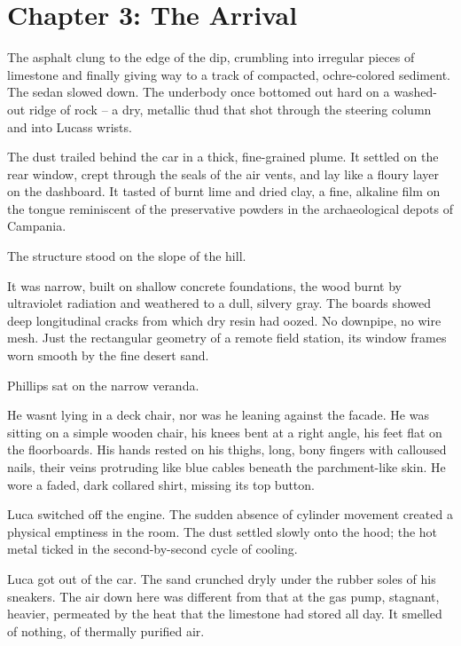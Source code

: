 \documentclass[
  ngerman,
]{article}
\begin{document}
\section{}\label{section}

\section{\texorpdfstring{\textbf{Chapter 3: The
Arrival}}{Chapter 3: The Arrival}}\label{chapter-3-the-arrival}

The asphalt clung to the edge of the dip, crumbling into irregular
pieces of limestone and finally giving way to a track of compacted,
ochre-colored sediment. The sedan slowed down. The underbody once
bottomed out hard on a washed-out ridge of rock -- a dry, metallic thud
that shot through the steering column and into Lucas\textquotesingle s
wrists.

The dust trailed behind the car in a thick, fine-grained plume. It
settled on the rear window, crept through the seals of the air vents,
and lay like a floury layer on the dashboard. It tasted of burnt lime
and dried clay, a fine, alkaline film on the tongue reminiscent of the
preservative powders in the archaeological depots of Campania.

The structure stood on the slope of the hill.

It was narrow, built on shallow concrete foundations, the wood burnt by
ultraviolet radiation and weathered to a dull, silvery gray. The boards
showed deep longitudinal cracks from which dry resin had oozed. No
downpipe, no wire mesh. Just the rectangular geometry of a remote field
station, its window frames worn smooth by the fine desert sand.

Phillips sat on the narrow veranda.

He wasn\textquotesingle t lying in a deck chair, nor was he leaning
against the facade. He was sitting on a simple wooden chair, his knees
bent at a right angle, his feet flat on the floorboards. His hands
rested on his thighs, long, bony fingers with calloused nails, their
veins protruding like blue cables beneath the parchment-like skin. He
wore a faded, dark collared shirt, missing its top button.

Luca switched off the engine. The sudden absence of cylinder movement
created a physical emptiness in the room. The dust settled slowly onto
the hood; the hot metal ticked in the second-by-second cycle of cooling.

Luca got out of the car. The sand crunched dryly under the rubber soles
of his sneakers. The air down here was different from that at the gas
pump, stagnant, heavier, permeated by the heat that the limestone had
stored all day. It smelled of nothing, of thermally purified air.
\end{document}
